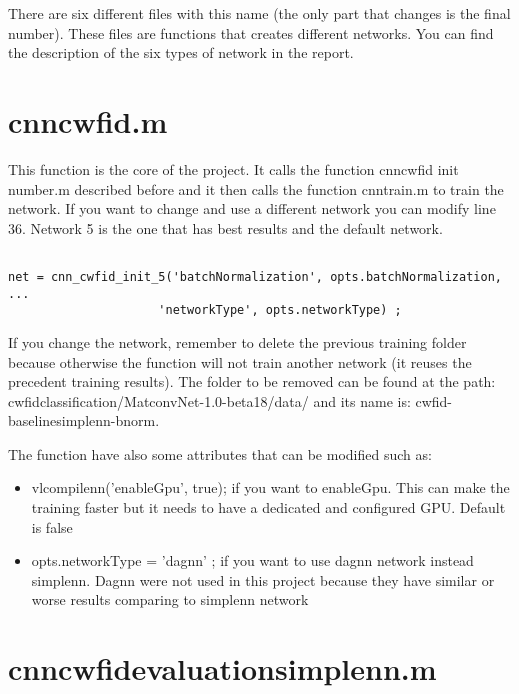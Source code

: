 \documentclass[]{report}
\begin{document}
There are six different files with this name (the only part that changes is the final number). These files are functions that creates different networks. You can find the description of the six types of network in the report.

\section{cnn\textunderscore cwfid.m}

This function is the core of the project. It calls the function cnn\textunderscore cwfid \textunderscore init \textunderscore *number.m described before and it then calls the function cnn\textunderscore train.m to train the network. If you want to change and use a different network you can modify line 36. Network 5 is the one that has best results and the default network.

\begin{lstlisting}

net = cnn_cwfid_init_5('batchNormalization', opts.batchNormalization, ...
                     'networkType', opts.networkType) ;

\end{lstlisting}

If you change the network, remember to delete the previous training folder because otherwise the function will not train another network (it reuses the precedent training results). The folder to be removed can be found at the path: cwfid\textunderscore classification/MatconvNet-1.0-beta18/data/ and its name is: cwfid-baselinesimplenn-bnorm. 

The function have also some attributes that can be modified such as:

\begin{itemize}

	\item vl\textunderscore compilenn('enableGpu', true); if you want to enableGpu. This can make the training faster but it needs to have a dedicated and configured GPU. Default is false
	\item opts.networkType = 'dagnn' ; if you want to use dagnn network instead simplenn. Dagnn were not used in this project because they have similar or worse results comparing to simplenn network
	

\end{itemize}


\section{cnn\textunderscore cwfid\textunderscore evaluation\textunderscore simplenn.m}
\end{document}
